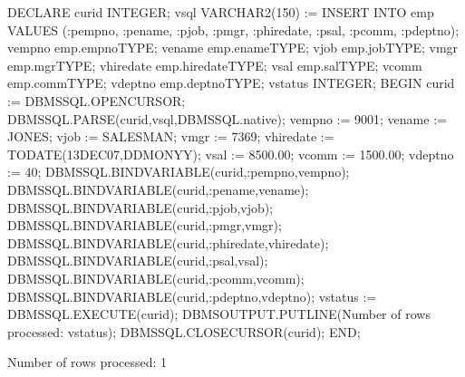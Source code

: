 \documentclass[letterpaper,10pt,english,openany,oneside]{sphinxmanual}
\begin{document}
%
\begin{sphinxVerbatim}[commandchars=\\\{\}]
DECLARE
    curid           INTEGER;
    v\PYGZus{}sql           VARCHAR2(150) := \PYGZsq{}INSERT INTO emp VALUES \PYGZsq{} \textbar{}\textbar{}
                        \PYGZsq{}(:p\PYGZus{}empno, :p\PYGZus{}ename, :p\PYGZus{}job, :p\PYGZus{}mgr, \PYGZsq{} \textbar{}\textbar{}
                        \PYGZsq{}:p\PYGZus{}hiredate, :p\PYGZus{}sal, :p\PYGZus{}comm, :p\PYGZus{}deptno)\PYGZsq{};
    v\PYGZus{}empno         emp.empno\PYGZpc{}TYPE;
    v\PYGZus{}ename         emp.ename\PYGZpc{}TYPE;
    v\PYGZus{}job           emp.job\PYGZpc{}TYPE;
    v\PYGZus{}mgr           emp.mgr\PYGZpc{}TYPE;
    v\PYGZus{}hiredate      emp.hiredate\PYGZpc{}TYPE;
    v\PYGZus{}sal           emp.sal\PYGZpc{}TYPE;
    v\PYGZus{}comm          emp.comm\PYGZpc{}TYPE;
    v\PYGZus{}deptno        emp.deptno\PYGZpc{}TYPE;
    v\PYGZus{}status        INTEGER;
BEGIN
    curid := DBMS\PYGZus{}SQL.OPEN\PYGZus{}CURSOR;
    DBMS\PYGZus{}SQL.PARSE(curid,v\PYGZus{}sql,DBMS\PYGZus{}SQL.native);
    v\PYGZus{}empno    := 9001;
    v\PYGZus{}ename    := \PYGZsq{}JONES\PYGZsq{};
    v\PYGZus{}job      := \PYGZsq{}SALESMAN\PYGZsq{};
    v\PYGZus{}mgr      := 7369;
    v\PYGZus{}hiredate := TO\PYGZus{}DATE(\PYGZsq{}13\PYGZhy{}DEC\PYGZhy{}07\PYGZsq{},\PYGZsq{}DD\PYGZhy{}MON\PYGZhy{}YY\PYGZsq{});
    v\PYGZus{}sal      := 8500.00;
    v\PYGZus{}comm     := 1500.00;
    v\PYGZus{}deptno   := 40;
    DBMS\PYGZus{}SQL.BIND\PYGZus{}VARIABLE(curid,\PYGZsq{}:p\PYGZus{}empno\PYGZsq{},v\PYGZus{}empno);
    DBMS\PYGZus{}SQL.BIND\PYGZus{}VARIABLE(curid,\PYGZsq{}:p\PYGZus{}ename\PYGZsq{},v\PYGZus{}ename);
    DBMS\PYGZus{}SQL.BIND\PYGZus{}VARIABLE(curid,\PYGZsq{}:p\PYGZus{}job\PYGZsq{},v\PYGZus{}job);
    DBMS\PYGZus{}SQL.BIND\PYGZus{}VARIABLE(curid,\PYGZsq{}:p\PYGZus{}mgr\PYGZsq{},v\PYGZus{}mgr);
    DBMS\PYGZus{}SQL.BIND\PYGZus{}VARIABLE(curid,\PYGZsq{}:p\PYGZus{}hiredate\PYGZsq{},v\PYGZus{}hiredate);
    DBMS\PYGZus{}SQL.BIND\PYGZus{}VARIABLE(curid,\PYGZsq{}:p\PYGZus{}sal\PYGZsq{},v\PYGZus{}sal);
    DBMS\PYGZus{}SQL.BIND\PYGZus{}VARIABLE(curid,\PYGZsq{}:p\PYGZus{}comm\PYGZsq{},v\PYGZus{}comm);
    DBMS\PYGZus{}SQL.BIND\PYGZus{}VARIABLE(curid,\PYGZsq{}:p\PYGZus{}deptno\PYGZsq{},v\PYGZus{}deptno);
    v\PYGZus{}status := DBMS\PYGZus{}SQL.EXECUTE(curid);
    DBMS\PYGZus{}OUTPUT.PUT\PYGZus{}LINE(\PYGZsq{}Number of rows processed: \PYGZsq{} \textbar{}\textbar{} v\PYGZus{}status);
    DBMS\PYGZus{}SQL.CLOSE\PYGZus{}CURSOR(curid);
END;

Number of rows processed: 1
\end{sphinxVerbatim}
\end{document}
